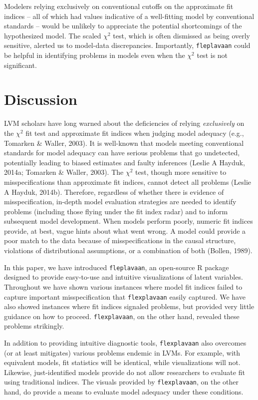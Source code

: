 \documentclass[
  english,
  doc]{apa6}
\begin{document}
Modelers relying exclusively on conventional cutoffs on the approximate fit indices -- all of which had values indicative of a well-fitting model by conventional standards -- would be unlikely to appreciate the potential shortcomings of the hypothesized model. The scaled \(\chi^2\) test, which is often dismissed as being overly sensitive, alerted us to model-data discrepancies. Importantly, \texttt{fleplavaan} could be helpful in identifying problems in models even when the \(\chi^2\) test is not significant.

\hypertarget{discussion}{%
\section{Discussion}\label{discussion}}

LVM scholars have long warned about the deficiencies of relying \emph{exclusively} on the \(\chi^2\) fit test and approximate fit indices when judging model adequacy (e.g., Tomarken \& Waller, 2003). It is well-known that models meeting conventional standards for model adequacy can have serious problems that go undetected, potentially leading to biased estimates and faulty inferences (Leslie A Hayduk, 2014a; Tomarken \& Waller, 2003). The \(\chi^2\) test, though more sensitive to misspecifications than approximate fit indices, cannot detect all problems (Leslie A Hayduk, 2014b). Therefore, regardless of whether there is evidence of misspecification, in-depth model evaluation strategies are needed to identify problems (including those flying under the fit index radar) and to inform subsequent model development. When models perform poorly, numeric fit indices provide, at best, vague hints about what went wrong. A model could provide a poor match to the data because of misspecifications in the causal structure, violations of distributional assumptions, or a combination of both (Bollen, 1989).

In this paper, we have introduced \texttt{fleplavaan}, an open-source R package designed to provide easy-to-use and intuitive visualizations of latent variables. Throughout we have shown various instances where model fit indices failed to capture important misspecification that \texttt{flexplavaan} easily captured. We have also showed instances where fit indices signaled problems, but provided very little guidance on how to proceed. \texttt{flexplavaan}, on the other hand, revealed these problems strikingly.

In addition to providing intuitive diagnostic tools, \texttt{flexplavaan} also overcomes (or at least mitigates) various problems endemic in LVMs. For example, with equivalent models, fit statistics will be identical, while visualizations will not. Likewise, just-identified models provide do not allow researchers to evaluate fit using traditional indices. The visuals provided by \texttt{flexplavaan}, on the other hand, do provide a means to evaluate model adequacy under these conditions.
\end{document}
